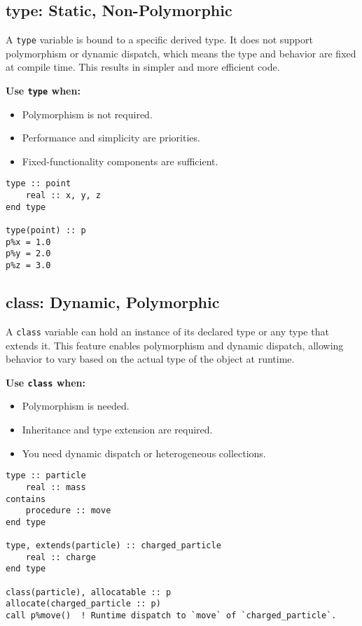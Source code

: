 \subsection{type: Static, Non-Polymorphic}
A \texttt{type} variable is bound to a specific derived type. It does not support polymorphism or dynamic dispatch, which means the type and behavior are fixed at compile time. This results in simpler and more efficient code.

\textbf{Use \texttt{type} when:}
\begin{itemize}
    \item Polymorphism is not required.
    \item Performance and simplicity are priorities.
    \item Fixed-functionality components are sufficient.
\end{itemize}

\begin{lstlisting}[caption={Example of type Usage}, label={lst:type_example}]
type :: point
    real :: x, y, z
end type

type(point) :: p
p%x = 1.0
p%y = 2.0
p%z = 3.0
\end{lstlisting}

\subsection{class: Dynamic, Polymorphic}
A \texttt{class} variable can hold an instance of its declared type or any type that extends it. This feature enables polymorphism and dynamic dispatch, allowing behavior to vary based on the actual type of the object at runtime.

\textbf{Use \texttt{class} when:}
\begin{itemize}
    \item Polymorphism is needed.
    \item Inheritance and type extension are required.
    \item You need dynamic dispatch or heterogeneous collections.
\end{itemize}

\begin{lstlisting}[caption={Example of class Usage}, label={lst:class_example}]
type :: particle
    real :: mass
contains
    procedure :: move
end type

type, extends(particle) :: charged_particle
    real :: charge
end type

class(particle), allocatable :: p
allocate(charged_particle :: p)
call p%move()  ! Runtime dispatch to `move` of `charged_particle`.
\end{lstlisting}

